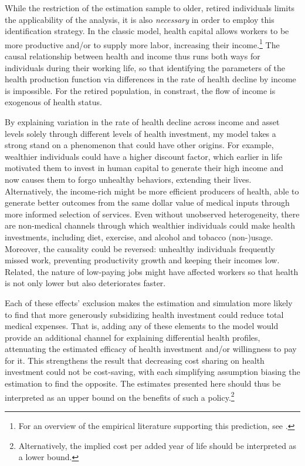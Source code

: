 \documentclass[12pt,pdftex,letterpaper]{article}
\begin{document}
While the restriction of the estimation sample to older, retired individuals limits the applicability of the analysis, it is also \textit{necessary} in order to employ this identification strategy.  In the classic \cite{grossman72} model, health capital allows workers to be more productive and/or to supply more labor, increasing their income.\footnote{For an overview of the empirical literature supporting this prediction, see \cite{currie99}.}  The causal relationship between health and income thus runs both ways for individuals during their working life, so that identifying the parameters of the health production function via differences in the rate of health decline by income is impossible.  For the retired population, in constrast, the flow of income is exogenous of health status.

By explaining variation in the rate of health decline across income and asset levels solely through different levels of health investment, my model takes a strong stand on a phenomenon that could have other origins.  For example, wealthier individuals could have a higher discount factor, which earlier in life motivated them to invest in human capital to generate their high income and now causes them to forgo unhealthy behaviors, extending their lives.  Alternatively, the income-rich might be more efficient producers of health, able to generate better outcomes from the same dollar value of medical inputs through more informed selection of services. Even without unobserved heterogeneity, there are non-medical channels through which wealthier individuals could make health investments, including diet, exercise, and alcohol and tobacco (non-)usage.  Moreover, the causality could be reversed: unhealthy individuals frequently missed work, preventing productivity growth and keeping their incomes low.  Related, the nature of low-paying jobs might have affected workers so that health is not only lower but also deteriorates faster.

Each of these effects' exclusion makes the estimation and simulation more likely to find that more generously subsidizing health investment could reduce total medical expenses.  That is, adding any of these elements to the model would provide an additional channel for explaining differential health profiles, attenuating the estimated efficacy of health investment and/or willingness to pay for it.  This strengthens the result that decreasing cost sharing on health investment could not be cost-saving, with each simplifying assumption biasing the estimation to find the opposite.  The estimates presented here should thus be interpreted as an upper bound on the benefits of such a policy.\footnote{Alternatively, the implied cost per added year of life should be interpreted as a lower bound.}
\end{document}
